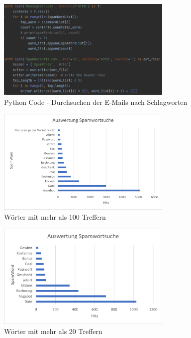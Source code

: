 \begin{figure}
    \centering
    \includegraphics[width=0.75\textwidth]{images/python_Spamwordsearch.PNG}
    \caption{Python Code - Durchsuchen der E-Mails nach Schlagworten} 
    \label{fig:spamwordsearch}
\end{figure}

\begin{figure}
    \centering
    \includegraphics[width=0.75\textwidth]{images/Auswertung_Spamwortsuche.png}
    \caption{Wörter mit mehr als 100 Treffern} 
    \label{fig:spamwortlistegreater100}
\end{figure}


\begin{figure}
    \centering
    \includegraphics[width=0.75\textwidth]{images/Merged_Auswertung_Spamwortsuche.png}
    \caption{Wörter mit mehr als 20 Treffern} 
    \label{fig:spamwortlistegreater20merged}
\end{figure}